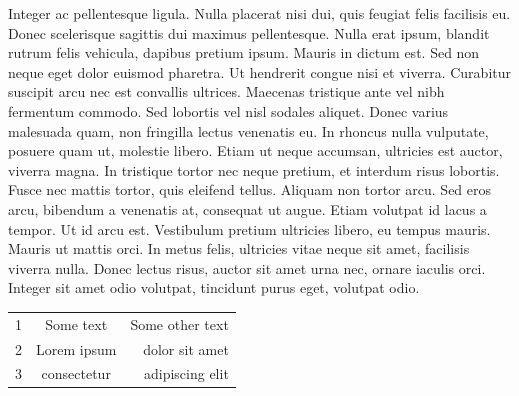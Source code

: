 \documentclass[a4paper]{article}
\begin{document}
\begin{multicols}{5}
		Integer ac pellentesque ligula. Nulla placerat nisi dui, quis feugiat felis facilisis eu. Donec scelerisque sagittis dui maximus pellentesque. Nulla erat ipsum, blandit rutrum felis vehicula, dapibus pretium ipsum. Mauris in dictum est. Sed non neque eget dolor euismod pharetra. Ut hendrerit congue nisi et viverra. Curabitur suscipit arcu nec est convallis ultrices. Maecenas tristique ante vel nibh fermentum commodo.
		Sed lobortis vel nisl sodales aliquet. Donec varius malesuada quam, non fringilla lectus venenatis eu. In rhoncus nulla vulputate, posuere quam ut, molestie libero. Etiam ut neque accumsan, ultricies est auctor, viverra magna. In tristique tortor nec neque pretium, et interdum risus lobortis. Fusce nec mattis tortor, quis eleifend tellus. Aliquam non tortor arcu. Sed eros arcu, bibendum a venenatis at, consequat ut augue. Etiam volutpat id lacus a tempor. Ut id arcu est. Vestibulum pretium ultricies libero, eu tempus mauris. Mauris ut mattis orci. In metus felis, ultricies vitae neque sit amet, facilisis viverra nulla. Donec lectus risus, auctor sit amet urna nec, ornare iaculis orci. Integer sit amet odio volutpat, tincidunt purus eget, volutpat odio.
    \end{multicols}
    \begin{tabular}{ l c r }
    1 & Some text & Some other text\\
    2 & Lorem ipsum & dolor sit amet\\
    3 & consectetur & adipiscing elit\\ 
    \end{tabular}
\end{document}
